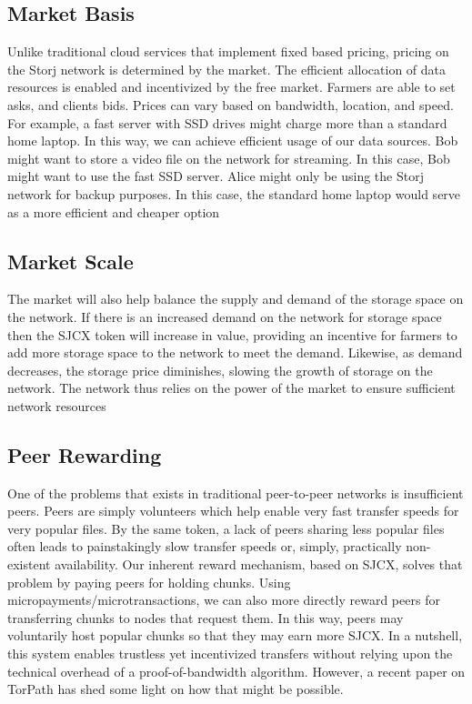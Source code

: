 \documentclass[a4paper,10pt]{article}
\begin{document}
\subsection{Market Basis}
Unlike traditional cloud services that implement fixed based pricing, pricing on the Storj network is determined by the market. The efficient allocation of data resources is enabled and incentivized by the free market. Farmers are able to set asks, and clients bids. Prices can vary based on bandwidth, location, and speed. For example, a fast server with SSD drives might charge more than a standard home laptop. In this way, we can achieve efficient usage of our data sources. Bob might want to store a video file on the network for streaming. In this case, Bob might want to use the fast SSD server. Alice might only be using the Storj network for backup purposes. In this case, the standard home laptop would serve as a more efficient and cheaper option

\subsection{Market Scale}
The market will also help balance the supply and demand of the storage space on the network. If there is an increased demand on the network for storage space then the SJCX token will increase in value, providing an incentive for farmers to add more storage space to the network to meet the demand. Likewise, as demand decreases, the storage price diminishes, slowing the growth of storage on the network. The network thus relies on the power of the market to ensure sufficient network resources 

\subsection{Peer Rewarding}
One of the problems that exists in traditional peer-to-peer networks is insufficient peers. Peers are simply volunteers which help enable very fast transfer speeds for very popular files. By the same token, a lack of peers sharing less popular files often leads to painstakingly slow transfer speeds or, simply, practically non-existent availability. Our inherent reward mechanism, based on SJCX, solves that problem by paying peers for holding chunks. Using micropayments/microtransactions, we can also more directly reward peers for transferring chunks to nodes that request them. In this way, peers may voluntarily host popular chunks so that they may earn more SJCX. In a nutshell, this system enables trustless yet incentivized transfers without relying upon the technical overhead of a proof-of-bandwidth algorithm. However, a recent paper on TorPath \cite{14} has shed some light on how that might be possible.  
\end{document}
